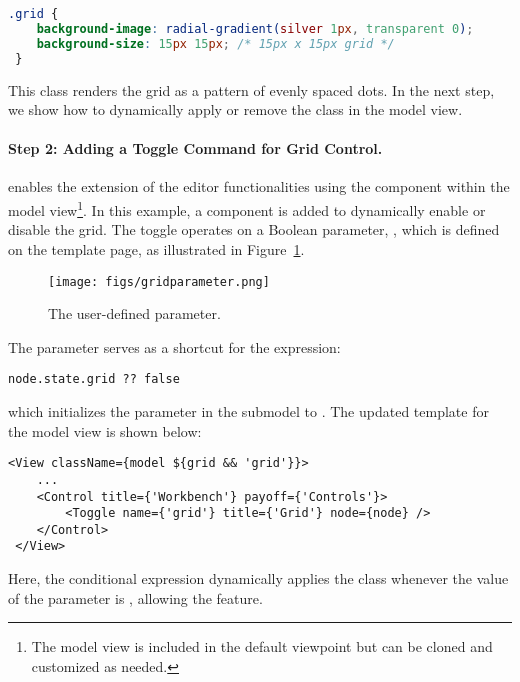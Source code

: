 \begin{lstlisting}[language=css]
 .grid {
    background-image: radial-gradient(silver 1px, transparent 0);
    background-size: 15px 15px; /* 15px x 15px grid */
 }
\end{lstlisting}

This class renders the grid as a pattern of evenly spaced dots. In the next step, we show how to dynamically apply or remove the  class in the model view.

\paragraph{Step 2: Adding a Toggle Command for Grid Control.}

\jjodel{} enables the extension of the editor functionalities using the  component within the model view\footnote{The model view is included in the default viewpoint but can be cloned and customized as needed.}. In this example, a  component is added to dynamically enable or disable the grid. The toggle operates on a Boolean parameter, , which is defined on the template page, as illustrated in Figure~\ref{fig:grid-parameter}.
%
\begin{figure}
\centering
\texttt{[image: figs/gridparameter.png]}
\caption{The user-defined  parameter.}
\label{fig:grid-parameter}
\end{figure}
%
The parameter  serves as a shortcut for the expression:\\
\begin{lstlisting}[language=JSX-template]
node.state.grid ?? false
\end{lstlisting}
which initializes the parameter in the  submodel to . The updated template for the model view is shown below:
%
\begin{lstlisting}[language=JSX-template]
 <View className={model ${grid && 'grid'}}>
    ...
    <Control title={'Workbench'} payoff={'Controls'}>
        <Toggle name={'grid'} title={'Grid'} node={node} />
    </Control>
 </View>
\end{lstlisting}
%
Here, the conditional expression  dynamically applies the  class whenever the value of the parameter  is , allowing the feature.

